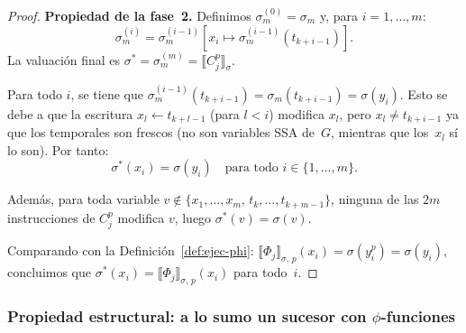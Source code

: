\documentclass[12pt, a4paper]{article}
\begin{document}
\begin{proof}
\medskip
\textbf{Propiedad de la fase~2.} Definimos $\sigma_m^{(0)} = \sigma_m$ y, para $i = 1, \ldots, m$:
\[
  \sigma_m^{(i)} = \sigma_m^{(i-1)}[x_i \mapsto \sigma_m^{(i-1)}(t_{k+i-1})].
\]
La valuación final es $\sigma^* = \sigma_m^{(m)} = \llbracket C_j^p \rrbracket_\sigma$.

Para todo $i$, se tiene que $\sigma_m^{(i-1)}(t_{k+i-1}) = \sigma_m(t_{k+i-1}) = \sigma(y_i)$.
Esto se debe a que la escritura $x_l \leftarrow t_{k+l-1}$ (para $l < i$) modifica $x_l$, pero
$x_l \neq t_{k+i-1}$ ya que los temporales son frescos (no son variables SSA de~$G$, mientras
que los~$x_l$ sí lo son). Por tanto:
\[
  \sigma^*(x_i) = \sigma(y_i) \quad \text{para todo } i \in \{1, \ldots, m\}.
\]

Además, para toda variable $v \notin \{x_1, \ldots, x_m,\, t_k, \ldots, t_{k+m-1}\}$,
ninguna de las $2m$ instrucciones de $C_j^p$ modifica $v$, luego $\sigma^*(v) = \sigma(v)$.

\medskip
Comparando con la Definición~\ref{def:ejec-phi}:
$\llbracket \Phi_j \rrbracket_{\sigma,\,p}(x_i) = \sigma(y_i^p) = \sigma(y_i)$,
concluimos que $\sigma^*(x_i) = \llbracket \Phi_j \rrbracket_{\sigma,\,p}(x_i)$ para todo~$i$.
\end{proof}

\subsubsection{Propiedad estructural: a lo sumo un sucesor con $\phi$-funciones}

%
\end{document}
